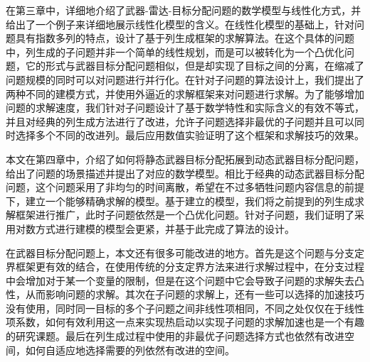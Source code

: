 在第三章中，详细地介绍了武器-雷达-目标分配问题的数学模型与线性化方式，并给出了一个例子来详细地展示线性化模型的含义。在线性化模型的基础上，针对问题具有指数多列的特点，设计了基于列生成框架的求解算法。在这个具体的问题中，列生成的子问题并非一个简单的线性规划，而是可以被转化为一个凸优化问题，它的形式与武器目标分配问题相似，但是却实现了目标之间的分离，在缩减了问题规模的同时可以对问题进行并行化。在针对子问题的算法设计上，我们提出了两种不同的建模方式，并使用外逼近的求解框架来对问题进行求解。为了能够增加问题的求解速度，我们针对子问题设计了基于数学特性和实际含义的有效不等式，并且对经典的列生成方法进行了改进，允许子问题选择非最优的子问题并且可以同时选择多个不同的改进列。最后应用数值实验证明了这个框架和求解技巧的效果。

本文在第四章中，介绍了如何将静态武器目标分配拓展到动态武器目标分配问题，给出了问题的场景描述并提出了对应的数学模型。相比于经典的动态武器目标分配问题，这个问题采用了非均匀的时间离散，希望在不过多牺牲问题内容信息的前提下，建立一个能够精确求解的模型。基于建立的模型，我们将之前提到的列生成求解框架进行推广，此时子问题依然是一个凸优化问题。针对子问题，我们证明了采用对数方式进行建模的模型会更紧，并基于此完成了算法的设计。

在武器目标分配问题上，本文还有很多可能改进的地方。首先是这个问题与分支定界框架更有效的结合，在使用传统的分支定界方法来进行求解过程中，在分支过程中会增加对于某一个变量的限制，但是在这个问题中它会导致子问题的求解失去凸性，从而影响问题的求解。其次在子问题的求解上，还有一些可以选择的加速技巧没有使用，同时同一目标的多个子问题之间非线性项相同，不同之处仅仅在于线性项系数，如何有效利用这一点来实现热启动以实现子问题的求解加速也是一个有趣的研究课题。最后在列生成过程中使用的非最优子问题选择方式也依然有改进空间，如何自适应地选择需要的列依然有改进的空间。